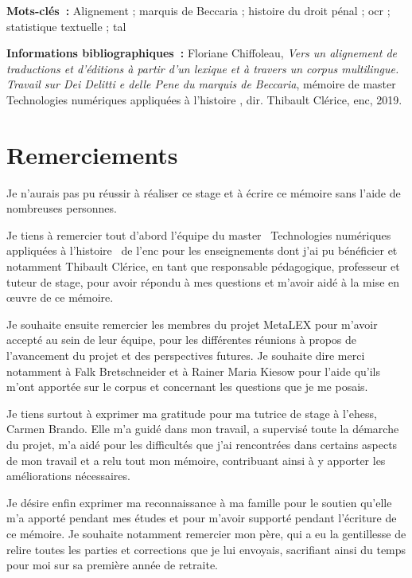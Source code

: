 \documentclass[a4paper,12pt, twoside]{book}
\begin{document}
\medskip

\textbf{Mots-clés~:} Alignement ; marquis de Beccaria ; histoire du droit pénal ; \acrlong{ocr} ; statistique textuelle ; \acrlong{tal}

\textbf{Informations bibliographiques~:} Floriane Chiffoleau, \textit{Vers un alignement de traductions et d'éditions à partir d'un lexique et à travers un corpus multilingue. Travail sur \emph{Dei Delitti e delle Pene} du marquis de Beccaria}, mémoire de master \og Technologies numériques appliquées à l'histoire \fg{}, dir. Thibault Clérice, \acrlong{enc}, 2019.

\chapter*{Remerciements}
Je n'aurais pas pu réussir à réaliser ce stage et à écrire ce mémoire sans l'aide de nombreuses personnes.

Je tiens à remercier tout d'abord l'équipe du master \og~Technologies numériques appliquées à l'histoire~\fg{} de l'\acrlong{enc} pour les enseignements dont j'ai pu bénéficier et notamment Thibault Clérice, en tant que responsable pédagogique, professeur et tuteur de stage, pour avoir répondu à mes questions et m'avoir aidé à la mise en \oe uvre de ce mémoire.

Je souhaite ensuite remercier les membres du projet MetaLEX pour m'avoir accepté au sein de leur équipe, pour les différentes réunions à propos de l'avancement du projet et des perspectives futures. Je souhaite dire merci notamment à Falk Bretschneider et à Rainer Maria Kiesow pour l'aide qu'ils m'ont apportée sur le corpus et concernant les questions que je me posais.

Je tiens surtout à exprimer ma gratitude pour ma tutrice de stage à l'\acrshort{ehess}, Carmen Brando. Elle m'a guidé dans mon travail, a supervisé toute la démarche du projet, m'a aidé pour les difficultés que j'ai rencontrées dans certains aspects de mon travail et a relu tout mon mémoire, contribuant ainsi à y apporter les améliorations nécessaires.

Je désire enfin exprimer ma reconnaissance à ma famille pour le soutien qu'elle m'a apporté pendant mes études et pour m'avoir supporté pendant l'écriture de ce mémoire. Je souhaite notamment remercier mon père, qui a eu la gentillesse de relire toutes les parties et corrections que je lui envoyais, sacrifiant ainsi du temps pour moi sur sa première année de retraite.
\end{document}
